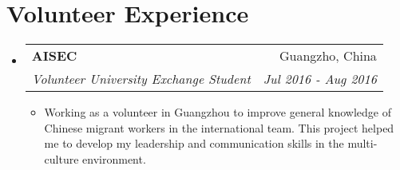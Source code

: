 \documentclass[letterpaper,11pt]{article}
\makeatletter
\newcommand{\resumeItemSimple}[1]{
  \item\small{#1 \vspace{-2pt}}
}
\newcommand{\resumeSubheading}[5]{
  \vspace{-1pt}\item
    \begin{tabular*}{0.97\textwidth}[t]{l@{\extracolsep{\fill}}r}
      \textbf{#1} \textit{\small{#5}}  & #2 \\
      \textit{\small #3} & \textit{\small #4} \\
    \end{tabular*}\vspace{-5pt}
}
\newcommand{\resumeSubHeadingListStart}{\begin{itemize}[leftmargin=*]}
\newcommand{\resumeSubHeadingListEnd}{\end{itemize}}
\newcommand{\resumeItemListStart}{\begin{itemize}}
\newcommand{\resumeItemListEnd}{\end{itemize}\vspace{-5pt}}
\makeatother
\begin{document}
\section{Volunteer Experience}
  \resumeSubHeadingListStart
    \resumeSubheading
      {AISEC}{Guangzho, China}
      {Volunteer University Exchange Student}{Jul 2016 - Aug 2016}{}
    \resumeItemListStart
    	\resumeItemSimple{Working as a volunteer in Guangzhou to improve general knowledge of Chinese migrant workers in the international team. This project helped me to develop my leadership and communication skills in the multi-culture environment.}
    \resumeItemListEnd	 		
  \resumeSubHeadingListEnd

\end{document}
